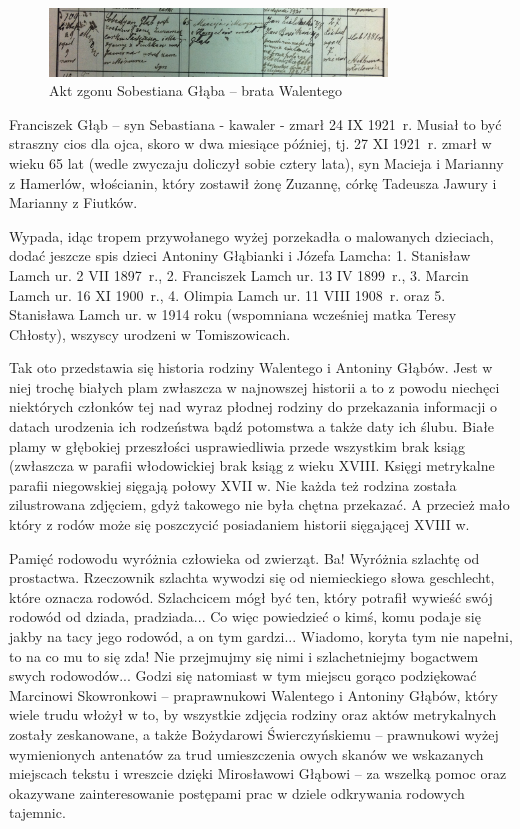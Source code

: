 \begin{figure}[!h]
\begin{center}
\includegraphics[width=0.8\textwidth]{zdjecia/akt_zgonu_sobestiana_glaba.jpg}
\caption[Akt zgonu Sobestiana Głąba]{Akt zgonu Sobestiana Głąba -- brata Walentego}
\label{rys:akt_zgonu_sobestiana_glaba}
\end{center}
\end{figure}

Franciszek Głąb -- syn Sebastiana - kawaler - zmarł 24 IX 1921~r. Musiał to być straszny cios dla ojca, skoro w dwa miesiące później, tj. 27 XI 1921~r. zmarł w wieku 65 lat (wedle zwyczaju doliczył sobie cztery lata), syn Macieja i Marianny z Hamerlów, włościanin, który zostawił żonę Zuzannę, córkę Tadeusza Jawury i Marianny z Fiutków.

Wypada, idąc tropem przywołanego wyżej porzekadła o malowanych dzieciach, dodać jeszcze spis dzieci Antoniny Głąbianki i Józefa Lamcha: 1. Stanisław Lamch ur. 2 VII 1897~r., 2. Franciszek Lamch ur. 13 IV 1899~r., 3. Marcin Lamch ur. 16 XI 1900~r., 4. Olimpia Lamch ur. 11 VIII 1908~r. oraz 5. Stanisława Lamch ur. w 1914 roku (wspomniana wcześniej matka Teresy Chłosty), wszyscy urodzeni w Tomiszowicach.

Tak oto przedstawia się historia rodziny Walentego i Antoniny Głąbów. Jest w niej trochę białych plam zwłaszcza w najnowszej historii a to z powodu niechęci niektórych członków tej nad wyraz płodnej rodziny do przekazania informacji o datach urodzenia ich rodzeństwa bądź potomstwa a także daty ich ślubu. Białe plamy w głębokiej przeszłości usprawiedliwia przede wszystkim brak ksiąg (zwłaszcza w parafii włodowickiej brak ksiąg z wieku XVIII. Księgi metrykalne parafii niegowskiej sięgają połowy XVII w.
Nie każda też rodzina została zilustrowana zdjęciem, gdyż takowego nie była chętna przekazać. A przecież mało który z rodów może się poszczycić posiadaniem historii sięgającej XVIII w. 

Pamięć rodowodu wyróżnia człowieka od zwierząt. Ba! Wyróżnia szlachtę od prostactwa. Rzeczownik szlachta wywodzi się od niemieckiego słowa geschlecht, które oznacza rodowód. Szlachcicem mógł być ten, który potrafił wywieść swój rodowód od dziada, pradziada... Co więc powiedzieć o kimś, komu podaje się jakby na tacy jego rodowód, a on tym gardzi... Wiadomo, koryta tym nie napełni, to na co mu to się zda! Nie przejmujmy się nimi i szlachetniejmy bogactwem swych rodowodów... Godzi się natomiast w tym miejscu gorąco podziękować Marcinowi Skowronkowi -- praprawnukowi Walentego i Antoniny Głąbów, który wiele trudu włożył w to, by wszystkie zdjęcia rodziny oraz aktów metrykalnych zostały zeskanowane, a także Bożydarowi Świerczyńskiemu -- prawnukowi wyżej wymienionych antenatów za trud umieszczenia owych skanów we wskazanych miejscach tekstu i wreszcie dzięki Mirosławowi Głąbowi -- za wszelką pomoc oraz okazywane zainteresowanie postępami prac w dziele odkrywania rodowych tajemnic.

